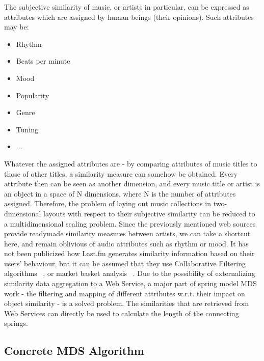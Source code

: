 The subjective similarity of music, or artists in particular, can be expressed as attributes which are assigned by human beings (their opinions). Such attributes may be:

\begin{itemize}
	\item Rhythm
	\item Beats per minute
	\item Mood
	\item Popularity
	\item Genre
	\item Tuning
	\item ...
\end{itemize}

Whatever the assigned attributes are - by comparing attributes of music titles to those of other titles, a similarity measure can somehow be obtained. Every attribute then can be seen as another dimension, and every music title or artist is an object in a space of N dimensions, where N is the number of attributes assigned. Therefore, the problem of laying out music collections in two-dimensional layouts with respect to their subjective similarity can be reduced to a multidimensional scaling problem.
Since the previously mentioned web sources provide readymade similarity measures between artists, we can take a shortcut here, and remain oblivious of audio attributes such as rhythm or mood. It has not been publicized how Last.fm generates similarity information based on their users' behaviour, but it can be assumed that they use Collaborative Filtering algorithms ~\cite{Takacs:2007}, or market basket analysis ~\cite{Aggarwal99anew}. Due to the possibility of externalizing similarity data aggregation to a Web Service, a major part of spring model MDS work - the filtering and mapping of different attributes w.r.t. their impact on object similarity - is a solved problem. The similarities that are retrieved from Web Services can directly be used to calculate the length of the connecting springs.

\subsection{Concrete MDS Algorithm}

